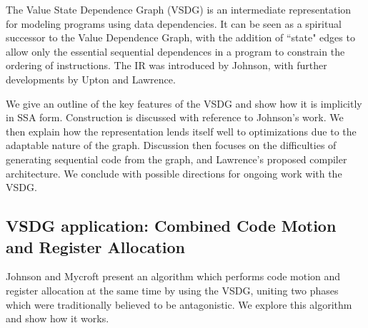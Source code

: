 The Value State Dependence Graph (VSDG) is an intermediate representation for modeling programs using data dependencies. It can be seen as a spiritual successor to the Value Dependence Graph\cite{177907}, with the addition of ``state" edges to allow only the essential sequential dependences in a program to constrain the ordering of instructions. The IR was introduced by Johnson\cite{UCAM-CL-TR-607}, with further developments by Upton\cite{upton} and Lawrence\cite{UCAM-CL-TR-705}.

We give an outline of the key features of the VSDG and show how it is implicitly in SSA form. Construction is discussed with reference to Johnson's work. We then explain how the representation lends itself well to optimizations due to the adaptable nature of the graph. Discussion then focuses on the difficulties of generating sequential code from the graph\cite{DBLP:conf/pdpta/Upton03}, and Lawrence's proposed compiler architecture. We conclude with possible directions for ongoing work with the VSDG.

\subsection*{VSDG application: Combined Code Motion and Register Allocation}

Johnson and Mycroft \cite{johnson-combined} present an algorithm which performs code motion and register allocation at the same time by using the VSDG, uniting two phases which were traditionally believed to be antagonistic. We explore this algorithm and show how it works.


